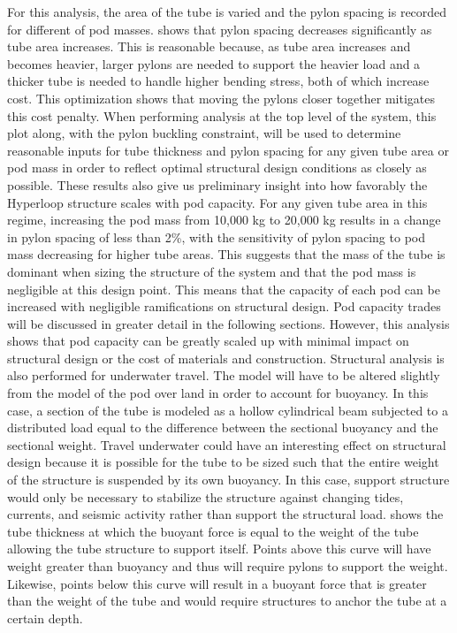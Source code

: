 For this analysis, the area of the tube is varied and the pylon spacing is
recorded for different of pod masses. 
shows that pylon spacing decreases significantly as tube area increases.
This is reasonable because, as tube area increases and becomes heavier, larger
pylons are needed to support the heavier load and a thicker tube is needed to
handle higher bending stress, both of which increase cost. This optimization
shows that moving the pylons closer together mitigates this cost penalty.
When performing analysis at the top level of the system, this plot along,
with the pylon buckling constraint, will be used to determine reasonable inputs
for tube thickness and pylon spacing for any given tube area or pod mass in
order to reflect optimal structural design conditions as closely as possible.
These results also give us preliminary insight into how favorably the Hyperloop
structure scales with pod capacity. For any given tube area in this regime,
increasing the pod mass from 10,000 kg to 20,000 kg results in a change in
pylon spacing of less than 2\%, with the sensitivity of pylon spacing to pod
mass decreasing for higher tube areas. This suggests that the mass of the tube
is dominant when sizing the structure of the system and that the pod mass is
negligible at this design point. This means that the capacity of each pod can be
increased with negligible ramifications on structural design. Pod capacity
trades will be discussed in greater detail in the following sections. However,
this analysis shows that pod capacity can be greatly scaled up with minimal
impact on structural design or the cost of materials and construction.
Structural analysis is also performed for underwater travel.
The model will have to be altered slightly from the model of the pod over land
in order to account for buoyancy. In this case, a section of the tube is
modeled as a hollow cylindrical beam subjected to a distributed load equal to
the difference between the sectional buoyancy and the sectional weight.
Travel underwater could have an interesting effect on structural design because
it is possible for the tube to be sized such that the entire weight of the
structure is suspended by its own buoyancy. In this case, support structure
would only be necessary to stabilize the structure against changing tides,
currents, and seismic activity rather than support the structural load.
 shows the tube thickness at which the buoyant
force is equal to the weight of the tube allowing the tube structure to support itself.
Points above this curve will have weight greater than buoyancy and thus will
require pylons to support the weight. Likewise, points below this curve will
result in a buoyant force that is greater than the weight of the tube and would
require structures to anchor the tube at a certain depth.

